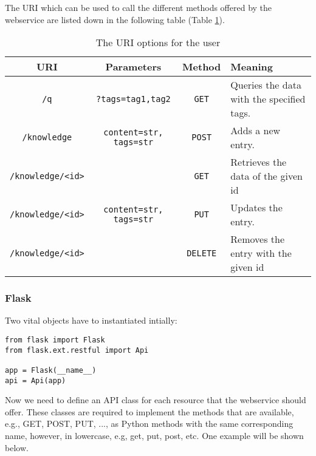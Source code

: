 \documentclass[11pt, a4paper]{article}
\begin{document}
The URI which can be used to call the different methods offered by the
webservice are listed down in the following table (Table \ref{tab:uri}).

\begin{table}[htbp]
  \centering
  \begin{tabular}{| c | c | c | l | } \hline
    \textbf{URI} & \textbf{Parameters} & \textbf{Method} & \textbf{Meaning} \\ \hline
    \lstinline|/q| & \lstinline|?tags=tag1,tag2| & \lstinline|GET| & Queries the data with the specified tags.  \\ \hline
    \lstinline|/knowledge| & \lstinline|content=str, tags=str| & \lstinline|POST| & Adds a new entry. \\ \hline
    \lstinline|/knowledge/<id>| &  & \lstinline|GET| & Retrieves the data of the given id  \\ \hline
    \lstinline|/knowledge/<id>| & \lstinline|content=str, tags=str| & \lstinline|PUT| & Updates the entry.   \\ \hline
    \lstinline|/knowledge/<id>| &  & \lstinline|DELETE| & Removes the entry with the given id \\ \hline
  \end{tabular}
  \caption{The URI options for the user}
  \label{tab:uri}
\end{table}

\subsubsection{Flask}

Two vital objects have to instantiated intially: 

\begin{lstlisting}
from flask import Flask
from flask.ext.restful import Api

app = Flask(__name__)
api = Api(app)
\end{lstlisting}
\vspace{10pt}

Now we need to define an API class for each resource that the webservice should
offer. These classes are required to implement the methods that are available,
e.g., GET, POST, PUT, ..., as Python methods with the same corresponding name,
however, in lowercase, e.g, get, put, post, etc. One example will be shown
below. 
\end{document}

